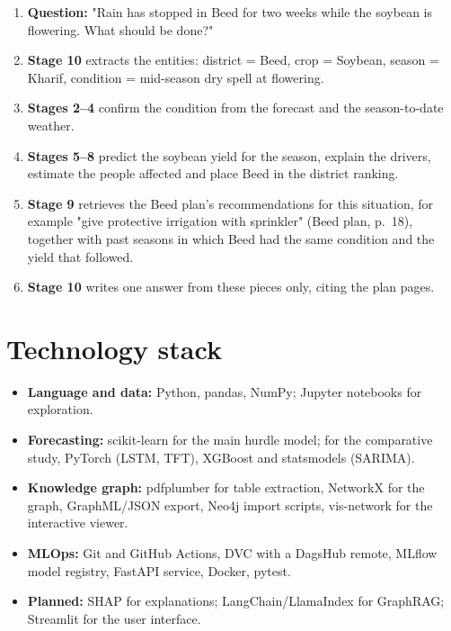 \begin{enumerate}
	\item \textbf{Question:} "Rain has stopped in Beed for two weeks while the soybean is flowering. What should be done?"
	\item \textbf{Stage 10} extracts the entities: district = Beed, crop = Soybean, season = Kharif, condition = mid-season dry spell at flowering.
	\item \textbf{Stages 2--4} confirm the condition from the forecast and the season-to-date weather.
	\item \textbf{Stages 5--8} predict the soybean yield for the season, explain the drivers, estimate the people affected and place Beed in the district ranking.
	\item \textbf{Stage 9} retrieves the Beed plan's recommendations for this situation, for example "give protective irrigation with sprinkler" (Beed plan, p.~18), together with past seasons in which Beed had the same condition and the yield that followed.
	\item \textbf{Stage 10} writes one answer from these pieces only, citing the plan pages.
\end{enumerate}

\section{Technology stack}
\begin{itemize}
	\item \textbf{Language and data:} Python, pandas, NumPy; Jupyter notebooks for exploration.
	\item \textbf{Forecasting:} scikit-learn \cite{pedregosa2011scikit} for the main hurdle model; for the comparative study, PyTorch \cite{paszke2019pytorch} (LSTM, TFT), XGBoost and statsmodels (SARIMA).
	\item \textbf{Knowledge graph:} pdfplumber for table extraction, NetworkX \cite{hagberg2008exploring} for the graph, GraphML/JSON export, Neo4j import scripts, vis-network for the interactive viewer.
	\item \textbf{MLOps:} Git and GitHub Actions, DVC with a DagsHub remote, MLflow \cite{zaharia2018accelerating} model registry, FastAPI service, Docker, pytest.
	\item \textbf{Planned:} SHAP for explanations; LangChain/LlamaIndex for GraphRAG; Streamlit for the user interface.
\end{itemize}
